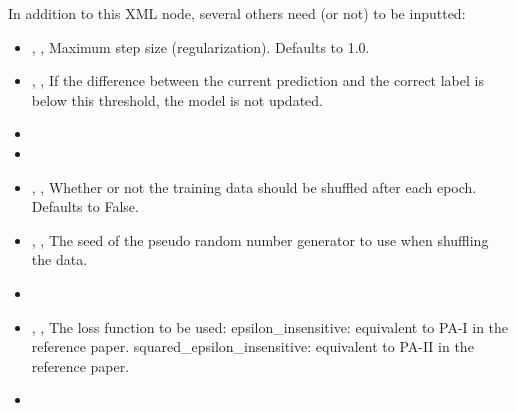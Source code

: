 %
In addition to this XML node, several others need (or not) to be inputted:
\begin{itemize}
  \item {} , ,
  Maximum step size (regularization).
  Defaults to 1.0.
  \item {} , ,
  If the difference between the current prediction and the correct label is
  below this threshold, the model is not updated.
  \item {}
  \item {}
  \item {} , ,
  Whether or not the training data should be shuffled after each epoch.
  Defaults to False.
  \item {} , ,
  The seed of the pseudo random number generator to use when shuffling the data.
  \item \verDescriptionB
  \item {} , ,
  The loss function to be used: epsilon\_insensitive: equivalent
  to PA-I in the reference paper.
  squared\_epsilon\_insensitive: equivalent to
  PA-II in the reference paper.
  \item \warmStartDescription{}
\end{itemize}

